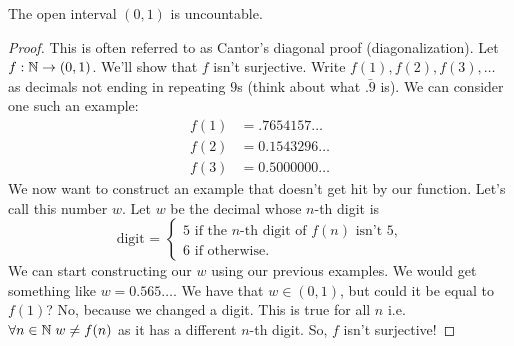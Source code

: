 \begin{example}
\begin{claim}
The open interval $(0, 1)$ is uncountable. 
\end{claim}
\begin{proof}
This is often referred to as Cantor's diagonal proof (diagonalization). Let $f: \mathbb{N} \to (0, 1)$. We'll show that $f$ isn't surjective. Write $f(1), f(2), f(3), \dots$ as decimals not ending in repeating $9$s (think about what $\bar{.9}$ is). We can consider one such an example:
\begin{align*}
    f(1) &= .7654157\dots \\
    f(2) &= 0.1543296 \dots \\
    f(3) &= 0.5000000 \dots 
\end{align*}
We now want to construct an example that doesn't get hit by our function. Let's call this number $w$. Let $w$ be the decimal whose $n$-th digit is 
\[
\text{digit = } \begin{cases}
        5 \text{ if the $n$-th digit of $f(n)$ isn't $5$,}
        \\
        6 \text{ if otherwise.}
        \end{cases}
\]
We can start constructing our $w$ using our previous examples. We would get something like $w = 0.565 \dots$. We have that $w \in (0,1)$, but could it be equal to $f(1)$? No, because we changed a digit. This is true for all $n$ i.e. $\forall n \in \mathbb{N} \; w \neq f(n)$ as it has a different $n$-th digit. So, $f$ isn't surjective!
\end{proof}
\end{example}

